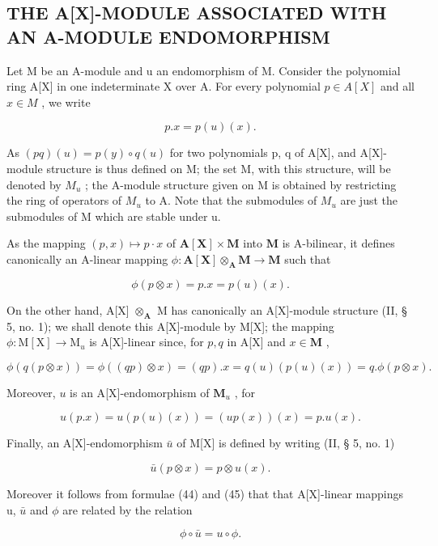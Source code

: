 \subsection{THE A{[}X{]}-MODULE ASSOCIATED WITH AN A-MODULE ENDOMORPHISM}

Let M be an A-module and u an endomorphism of M. Consider the polynomial ring A{[}X{]} in one indeterminate X over A. For every polynomial \(p \in A[X]\) and all \(x \in M\) , we write

\[
p. x = p (u) (x).\tag{43}
\]

As \((pq)(u) = p(y) \circ q(u)\) for two polynomials p, q of A{[}X{]}, and A{[}X{]}-module structure is thus defined on M; the set M, with this structure, will be denoted by \(M_{u}\) ; the A-module structure given on M is obtained by restricting the ring of operators of \(M_{u}\) to A. Note that the submodules of \(M_{u}\) are just the submodules of M which are stable under u.

As the mapping \((p, x) \mapsto p \cdot x\) of \(\mathbf{A}[\mathbf{X}] \times \mathbf{M}\) into \(\mathbf{M}\) is A-bilinear, it defines canonically an A-linear mapping \(\phi: \mathbf{A}[\mathbf{X}] \otimes_{\mathbf{A}} \mathbf{M} \to \mathbf{M}\) such that

\[
\phi (p \otimes x) = p. x = p (u) (x).\tag{44}
\]

On the other hand, A{[}X{]} \(\otimes_{\mathbf{A}}\) M has canonically an A{[}X{]}-module structure (II, § 5, no. 1); we shall denote this A{[}X{]}-module by M{[}X{]}; the mapping \(\phi: \mathrm{M}[\mathrm{X}] \to \mathrm{M}_u\) is A{[}X{]}-linear since, for \(p, q\) in A{[}X{]} and \(x \in \mathbf{M}\) ,

\[
\phi (q (p \otimes x)) = \phi ((q p) \otimes x) = (q p). x = q (u) (p (u) (x)) = q. \phi (p \otimes x).
\]

Moreover, \(u\) is an A{[}X{]}-endomorphism of \(\mathbf{M}_u\) , for

\[
u (p. x) = u (p (u) (x)) = (u p (x)) (x) = p. u (x).
\]

Finally, an A{[}X{]}-endomorphism \(\bar{u}\) of M{[}X{]} is defined by writing (II, § 5, no. 1)

\[
\bar {u} (p \otimes x) = p \otimes u (x).\tag{45}
\]

Moreover it follows from formulae (44) and (45) that that A{[}X{]}-linear mappings u, \(\bar{u}\) and \(\phi\) are related by the relation

\[
\phi \circ \bar {u} = u \circ \phi .\tag{46}
\]

